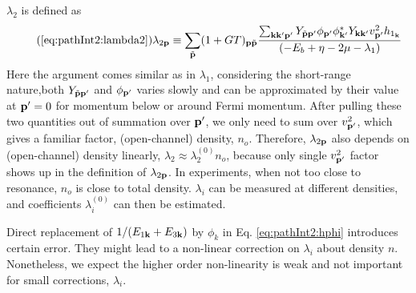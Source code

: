  $\lambda_2$ is defined as
\begin{equation}\tag{\ref{eq:pathInt2:lambda2}}
\lambda_{2\vp}\equiv\sum_{\tilde\vp}(1+GT)_{\vp\tilde\vp}\frac{\sum_{\vk\vk{'}\vp'} Y_{\tilde\vp\vp'}{\phi_{\vp'}}{\phi_{\vk'}^{*}}{Y_{\vk\vk'}}v_{\vp'}^{2}{h_{1_{\vk}}}}
		{\br{-E_{b}+\eta-2\mu-\lambda_{1}}}{}
\end{equation}
Here the argument comes similar as in $\lambda_{1}$, considering the short-range nature,both  $Y_{\tilde{\mathbf{p}}\mathbf{p}'}$ and $\phi_{\mathbf{p}'}$ varies slowly and can be approximated by their value at $\mathbf{p}'=0$ for momentum below or around Fermi momentum.  After pulling these two quantities out of  summation over $\mathbf{p}'$, we only need to sum over   $v_{\mathbf{p}'}^{2}$, which gives a familiar factor,  (open-channel) density, $n_{o}$. Therefore,  $\lambda_{2\mathbf{p}}$ also depends on (open-channel) density linearly, $\lambda_2\approx\lambda_2^{(0)}n_{o}$,  because only single $v_{\mathbf{p}'}^2$ factor shows up  in the definition of $\lambda_{2\mathbf{p}}$.  In experiments, when not too close to resonance, $n_o$ is close to total density.  $\lambda_{i}$ can be measured at different densities,  and coefficients $\lambda_{i}^{(0)}$ can then be estimated. 


Direct replacement of $1/(E_{1\mathbf{k}}+E_{3\mathbf{k}})$ by $\phi_{k}$ in Eq. \ref{eq:pathInt2:hphi} introduces certain error. They might lead to a non-linear correction on $\lambda_{i}$ about density $n$.  Nonetheless, we expect the higher order non-linearity is weak and not important for small corrections, $\lambda_{i}$.




